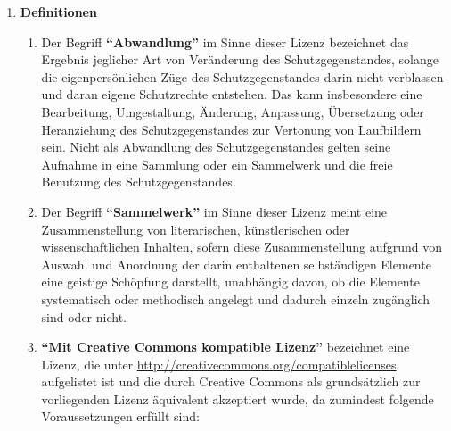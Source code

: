 \begin{enumerate}
  \item \label{item:1} \textbf{Definitionen}
    \begin{enumerate}
      \item Der Begriff \textbf{``Abwandlung''} im Sinne dieser Lizenz bezeichnet das Ergebnis jeglicher Art von Veränderung des Schutzgegenstandes, solange die eigenpersönlichen Züge des Schutzgegenstandes darin nicht verblassen und daran eigene Schutzrechte entstehen. Das kann insbesondere eine Bearbeitung, Umgestaltung, Änderung, Anpassung, Übersetzung oder Heranziehung des Schutzgegenstandes zur Vertonung von Laufbildern sein. Nicht als Abwandlung des Schutzgegenstandes gelten seine Aufnahme in eine Sammlung oder ein Sammelwerk und die freie Benutzung des Schutzgegenstandes.
      \item Der Begriff \textbf{``Sammelwerk''} im Sinne dieser Lizenz meint eine Zusammenstellung von literarischen, künstlerischen oder wissenschaftlichen Inhalten, sofern diese Zusammenstellung aufgrund von Auswahl und Anordnung der darin enthaltenen selbständigen Elemente eine geistige Schöpfung darstellt, unabhängig davon, ob die Elemente systematisch oder methodisch angelegt und dadurch einzeln zugänglich sind oder nicht.
      \item \textbf{``Mit Creative Commons kompatible Lizenz''} bezeichnet eine Lizenz, die unter \url{http://creativecommons.org/compatiblelicenses} aufgelistet ist und die durch Creative Commons als grundsätzlich zur vorliegenden Lizenz äquivalent akzeptiert wurde, da zumindest folgende Voraussetzungen erfüllt sind:


\end{enumerate}
\end{enumerate}

